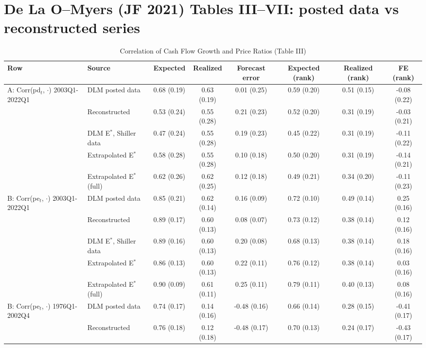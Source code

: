\documentclass[11pt]{article}
\begin{document}
\section*{De La O--Myers (JF 2021) Tables III--VII: posted data vs reconstructed series}
\begin{table}[H]
\centering
\caption{Correlation of Cash Flow Growth and Price Ratios (Table III)}
\label{tab:t3}
\small
\begin{adjustbox}{max width=\textwidth}
\begin{tabular}{llcccccc}
\toprule
Row & Source & Expected & Realized & Forecast error & Expected (rank) & Realized (rank) & FE (rank) \\
\midrule
A: Corr(pd$_t$, $\cdot$)  2003Q1-2022Q1 & DLM posted data & 0.68 (0.19) & 0.63 (0.19) & 0.01 (0.25) & 0.59 (0.20) & 0.51 (0.15) & -0.08 (0.22) \\
 & Reconstructed & 0.53 (0.24) & 0.55 (0.28) & 0.21 (0.23) & 0.52 (0.20) & 0.31 (0.19) & -0.03 (0.21) \\
 & DLM E$^*$, Shiller data & 0.47 (0.24) & 0.55 (0.28) & 0.19 (0.23) & 0.45 (0.22) & 0.31 (0.19) & -0.11 (0.22) \\
 & Extrapolated E$^*$ & 0.58 (0.28) & 0.55 (0.28) & 0.10 (0.18) & 0.50 (0.20) & 0.31 (0.19) & -0.14 (0.21) \\
 & Extrapolated E$^*$ (full) & 0.62 (0.26) & 0.62 (0.25) & 0.12 (0.18) & 0.49 (0.21) & 0.34 (0.20) & -0.11 (0.23) \\
\addlinespace
B: Corr(pe$_t$, $\cdot$)  2003Q1-2022Q1 & DLM posted data & 0.85 (0.21) & 0.62 (0.14) & 0.16 (0.09) & 0.72 (0.10) & 0.49 (0.14) & 0.25 (0.16) \\
 & Reconstructed & 0.89 (0.17) & 0.60 (0.13) & 0.08 (0.07) & 0.73 (0.12) & 0.38 (0.14) & 0.12 (0.16) \\
 & DLM E$^*$, Shiller data & 0.89 (0.16) & 0.60 (0.13) & 0.20 (0.08) & 0.68 (0.13) & 0.38 (0.14) & 0.18 (0.16) \\
 & Extrapolated E$^*$ & 0.86 (0.13) & 0.60 (0.13) & 0.22 (0.11) & 0.76 (0.12) & 0.38 (0.14) & 0.03 (0.16) \\
 & Extrapolated E$^*$ (full) & 0.90 (0.09) & 0.61 (0.11) & 0.25 (0.11) & 0.79 (0.11) & 0.40 (0.13) & 0.08 (0.16) \\
\addlinespace
B: Corr(pe$_t$, $\cdot$)  1976Q1-2002Q4 & DLM posted data & 0.74 (0.17) & 0.14 (0.16) & -0.48 (0.16) & 0.66 (0.14) & 0.28 (0.15) & -0.41 (0.17) \\
 & Reconstructed & 0.76 (0.18) & 0.12 (0.18) & -0.48 (0.17) & 0.70 (0.13) & 0.24 (0.17) & -0.43 (0.17) \\

\end{tabular}
\end{adjustbox}
\end{table}
\end{document}
